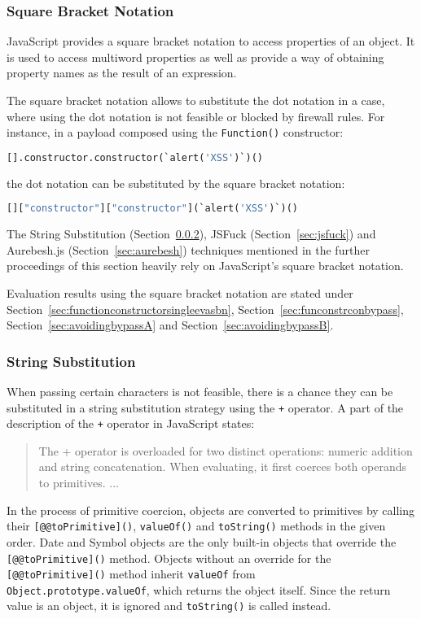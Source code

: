 \subsubsection{Square Bracket Notation}
\label{sec:sbn}
JavaScript provides a square bracket notation to access properties of an object. It is used to access multiword properties as well as provide a way of obtaining property names as the result of an expression. \cite{js/brackets}

The square bracket notation allows to substitute the dot notation in a case, where using the dot notation is not feasible or blocked by firewall rules.
For instance, in a payload composed using the \verb|Function()| constructor:

\begin{lstlisting}[style=basicStyle,language=Python]
[].constructor.constructor(`alert('XSS')`)()
\end{lstlisting}
the dot notation can be substituted by the square bracket notation:

\begin{lstlisting}[style=basicStyle,language=Python]
[]["constructor"]["constructor"](`alert('XSS')`)()
\end{lstlisting}
The String Substitution (Section~\ref{sec:stringreplace}), JSFuck (Section~\ref{sec:jsfuck}) and Aurebesh.js (Section~\ref{sec:aurebesh}) techniques mentioned in the further proceedings of this section heavily rely on JavaScript's square bracket notation.

Evaluation results using the square bracket notation are stated under Section~\ref{sec:functionconstructorsingleevasbn}, Section~\ref{sec:funconstrconbypass}, Section~\ref{sec:avoidingbypassA} and Section~\ref{sec:avoidingbypassB}.


\subsubsection{String Substitution}
\label{sec:stringreplace}
When passing certain characters is not feasible, there is a chance they can be substituted in a string substitution strategy using the \verb|+| operator.
A part of the description of the \verb|+| operator in JavaScript states:
\begin{quote}
	The + operator is overloaded for two distinct operations: numeric addition and string concatenation. When evaluating, it first coerces both operands to primitives. ... \cite{js/+}
\end{quote}
In the process of primitive coercion, objects are converted to primitives by calling their \verb|[@@toPrimitive]()|, \verb|valueOf()| and \verb|toString()| methods in the given order. Date and Symbol objects are the only built-in objects that override the \verb|[@@toPrimitive]()| method.
Objects without an override for the \verb|[@@toPrimitive]()| method inherit \verb|valueOf| from
\\ \verb|Object.prototype.valueOf|, which returns the object itself.
Since the return value is an object, it is ignored and \verb|toString()| is called instead. \cite{js/primitiveCoercion}

